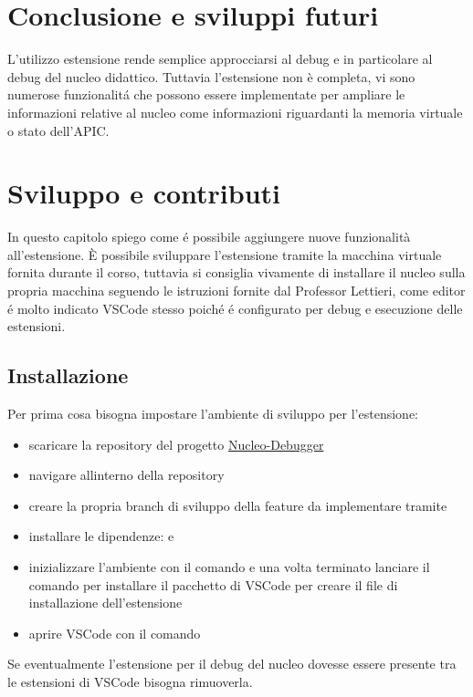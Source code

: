 \chapter{Conclusione e sviluppi futuri}
L'utilizzo estensione rende semplice approcciarsi al debug e in particolare al debug del nucleo didattico. Tuttavia l'estensione non è completa, vi sono numerose funzionalitá che possono essere implementate per ampliare le informazioni relative al nucleo come informazioni riguardanti la memoria virtuale o stato dell'APIC.

\chapter{Sviluppo e contributi}
In questo capitolo spiego come é possibile aggiungere nuove funzionalità all'estensione. È possibile sviluppare l'estensione tramite la macchina virtuale fornita durante il corso, tuttavia si consiglia vivamente di installare il nucleo sulla propria macchina seguendo le istruzioni fornite dal Professor Lettieri\cite{mainsite}, come editor é molto indicato VSCode stesso poiché é configurato per debug e esecuzione delle estensioni.

\section*{Installazione}
Per prima cosa bisogna impostare l'ambiente di sviluppo per l'estensione:
\begin{itemize}
    \item scaricare la repository del progetto \href{google.com}{Nucleo-Debugger} 
    \item navigare allinterno della repository
    \item creare la propria branch di sviluppo della feature da implementare tramite 
    \item installare le dipendenze:  e 
    \item inizializzare l'ambiente con il comando  e una volta terminato lanciare il comando  per installare il pacchetto di VSCode per creare il file di installazione dell'estensione
    \item aprire VSCode con il comando 
\end{itemize}

Se eventualmente l'estensione per il debug del nucleo dovesse essere presente tra le estensioni di VSCode bisogna rimuoverla.

